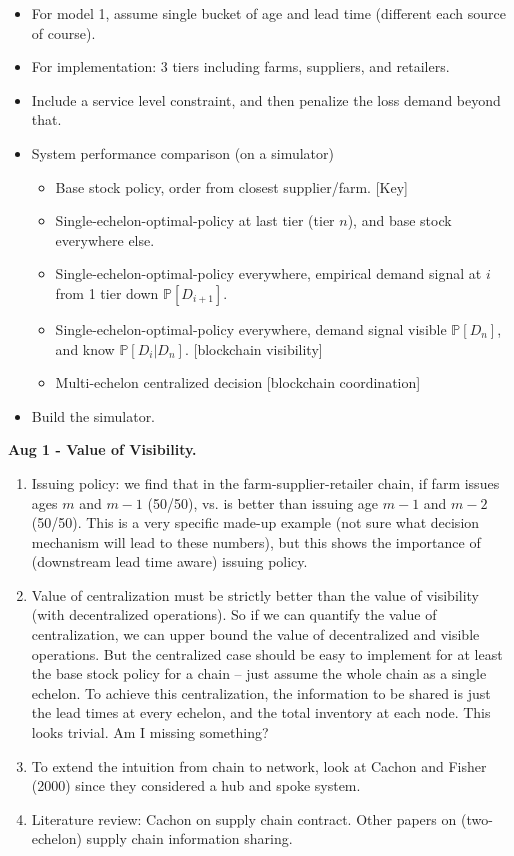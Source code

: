 \documentclass{article}
\newcommand{\pa}[1]{\noindent\textbf{\textsf{#1}}}
\begin{document}
\begin{itemize}
\item For model 1, assume single bucket of age and lead time (different each source of course).
\item For implementation: 3 tiers including farms, suppliers, and retailers.
\item Include a service level constraint, and then penalize the loss demand beyond that.
\item System performance comparison (on a simulator)
	\begin{itemize}
	\item Base stock policy, order from closest supplier/farm. [Key]
	\item Single-echelon-optimal-policy at last tier (tier $n$), and base stock everywhere else. 
	\item Single-echelon-optimal-policy everywhere, empirical demand signal at $i$ from 1 tier down $\mathbb{P}[D_{i+1}]$.
	\item Single-echelon-optimal-policy everywhere, demand signal visible $\mathbb{P}[D_{n}]$, and know $\mathbb{P}[D_i | D_n]$. [blockchain visibility]
	\item Multi-echelon centralized decision [blockchain coordination]
	\end{itemize}
\item Build the simulator.
\end{itemize}


\pa{Aug 1 - Value of Visibility.}
\newline

\begin{enumerate}
\item Issuing policy: we find that in the farm-supplier-retailer chain, if farm issues ages $m$ and $m-1$ (50/50), vs. is better than issuing age $m-1$ and $m-2$ (50/50). This is a very specific made-up example (not sure what decision mechanism will lead to these numbers), but this shows the importance of (downstream lead time aware) issuing policy.
\item  Value of centralization must be strictly better than the value of visibility (with decentralized operations). So if we can quantify the value of centralization, we can upper bound the value of decentralized and visible operations. But the centralized case should be easy to implement for at least the base stock policy for a chain -- just assume the whole chain as a single echelon. To achieve this centralization, the information to be shared is just the lead times at every echelon, and the total inventory at each node. This looks trivial. Am I missing something?
\item To extend the intuition from chain to network, look at Cachon and Fisher (2000) since they considered a hub and spoke system.
\item Literature review: Cachon on supply chain contract. Other papers on (two-echelon) supply chain information sharing.
\end{enumerate}
\end{document}
